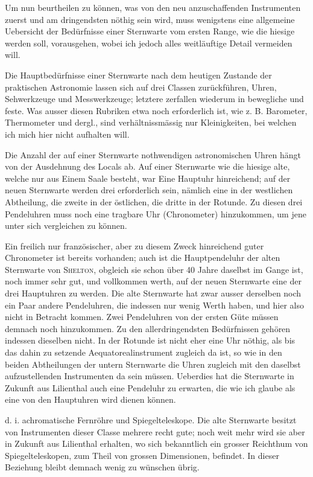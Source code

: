 Um nun beurtheilen zu können, was von den neu anzuschaffenden Instrumenten zuerst und am dringendsten nöthig sein wird, muss wenigstens eine allgemeine Uebersicht der Bedürfnisse einer Sternwarte vom ersten Range, wie die hiesige werden soll, vorausgehen, wobei ich jedoch alles weitläuftige Detail vermeiden will.

Die Hauptbedürfnisse einer Sternwarte nach dem heutigen Zustande der praktischen Astronomie lassen sich auf drei Classen zurückführen, Uhren, Sehwerkzeuge und Messwerkzeuge; letztere zerfallen wiederum in bewegliche und feste. Was ausser diesen Rubriken etwa noch erforderlich ist, wie z. B. Barometer, Thermometer und dergl., sind verhältnissmässig nur Kleinigkeiten, bei welchen ich mich hier nicht aufhalten will.

 Die Anzahl der auf einer Sternwarte nothwendigen astronomischen Uhren hängt von der Ausdehnung des Locals ab. Auf einer Sternwarte wie die hiesige alte, welche nur aus Einem Saale besteht, war Eine Hauptuhr hinreichend; auf der neuen Sternwarte werden drei erforderlich sein, nämlich eine in der westlichen Abtheilung, die zweite in der östlichen, die dritte in der Rotunde. Zu diesen drei Pendeluhren muss noch eine tragbare Uhr (Chronometer) hinzukommen, um jene unter sich vergleichen zu können.

Ein freilich nur französischer, aber zu diesem Zweck hinreichend guter Chronometer ist bereits vorhanden; auch ist die Hauptpendeluhr der alten Sternwarte von \textsc{Shelton}, obgleich sie schon über 40 Jahre daselbst im Gange ist, noch immer sehr gut, und vollkommen werth, auf der neuen Sternwarte eine der drei Hauptuhren zu werden. Die alte Sternwarte hat zwar ausser derselben noch ein Paar andere Pendeluhren, die indessen nur wenig Werth haben, und hier also nicht in Betracht kommen. Zwei Pendeluhren von der
\clearpage{}
\noindent ersten Güte müssen demnach noch hinzukommen. Zu den allerdringendsten Bedürfnissen gehören indessen dieselben nicht. In der Rotunde ist nicht eher eine Uhr nöthig, als bis das dahin zu setzende Aequatorealinstrument zugleich da ist, so wie in den beiden Abtheilungen der untern Sternwarte die Uhren zugleich mit den daselbst aufzustellenden Instrumenten da sein müssen. Ueberdies hat die Sternwarte in Zukunft aus Lilienthal auch eine Pendeluhr zu erwarten, die wie ich glaube als eine von den Hauptuhren wird dienen können.

 d. i. achromatische Fernröhre und Spiegelteleskope. Die alte Sternwarte besitzt von Instrumenten dieser Classe mehrere recht gute; noch weit mehr wird sie aber in Zukunft aus Lilienthal erhalten, wo sich bekanntlich ein grosser Reichthum von Spiegelteleskopen, zum Theil von grossen Dimensionen, befindet. In dieser Beziehung bleibt demnach wenig zu wünschen übrig.

